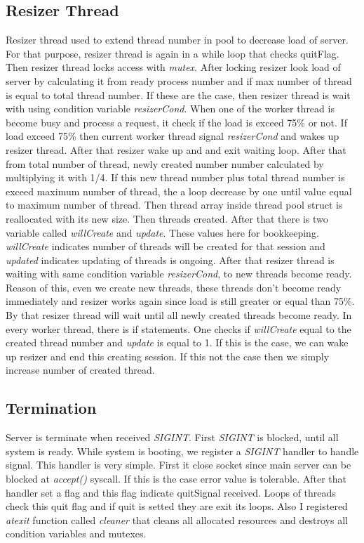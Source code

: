 \documentclass[letterpaper, 10 pt, conference]{ieeeconf}  %
\begin{document}
\subsection{Resizer Thread}
Resizer thread used to extend thread number in pool to decrease load of server. For that purpose, resizer thread is again in a while loop that checks quitFlag. Then resizer thread locks access with \textit{mutex}. After locking resizer look load of server by calculating it from ready process number and if max number of thread is equal to total thread number. If these are the case, then resizer thread is wait with using condition variable \textit{resizerCond}. When one of the worker thread is become busy and process a request, it check if the load is exceed 75\% or not. If load exceed 75\% then current worker thread signal \textit{resizerCond} and wakes up resizer thread. After that resizer wake up and and exit waiting loop. After that from total number of thread, newly created number number calculated by multiplying it with 1/4. If this new thread number plus total thread number is exceed maximum number of thread, the a loop decrease by one until value equal to maximum number of thread. Then thread array inside thread pool struct is reallocated with its new size. Then threads created. After that there is two variable called \textit{willCreate} and \textit{update}. These values here for bookkeeping. \textit{willCreate} indicates number of threads will be created for that session and \textit{updated} indicates updating of threads is ongoing. After that resizer thread is waiting with same condition variable \textit{resizerCond}, to new threads become ready. Reason of this, even we create new threads, these threads don't become ready immediately and resizer works again since load is still greater or equal than 75\%. By that resizer thread will wait until all newly created threads become ready. In every worker thread, there is if statements. One checks if \textit{willCreate} equal to the created thread number and \textit{update} is equal to 1. If this is the case, we can wake up resizer and end this creating session. If this not the case then we simply increase number of created thread. 

\subsection{Termination}
Server is terminate when received \textit{SIGINT}. First \textit{SIGINT} is blocked, until all system is ready. While system is booting, we register a \textit{SIGINT} handler to handle signal. This handler is very simple. First it close socket since main server can be blocked at \textit{accept()} syscall. If this is the case error value is tolerable. After that handler set a flag and this flag indicate quitSignal received. Loops of threads check this quit flag and if quit is setted they are exit its loops. Also I registered \textit{atexit} function called \textit{cleaner} that cleans all allocated resources and destroys all condition variables and mutexes.
\end{document}
